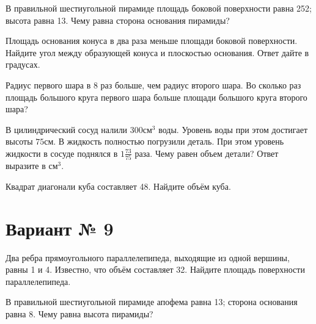 \documentclass[4apaper]{article}
\begin{document}
\begin{taskBN}{2}
В правильной шестиугольной пирамиде площадь боковой поверхности равна 252; высота равна 13. Чему равна сторона основания пирамиды?
\end{taskBN}

\begin{taskBN}{3}
Площадь основания конуса в два раза меньше площади боковой поверхности. Найдите угол между образующей конуса и плоскостью основания. Ответ дайте в градусах.
\end{taskBN}

\begin{taskBN}{4}
Радиус первого шара в 8 раз больше, чем радиус второго шара. Во сколько раз площадь большого круга первого шара больше площади большого круга второго шара?
\end{taskBN}

\begin{taskBN}{5}
В цилиндрический сосуд налили $300\mbox{см}^3$ воды. Уровень воды при этом достигает высоты $75$см. В жидкость полностью погрузили деталь. При этом уровень жидкости в сосуде поднялся в ${1}\frac{73}{75}$ раза. Чему равен объем детали? Ответ выразите в $\mbox{см}^3$.
\end{taskBN}

\begin{taskBN}{6}
Квадрат диагонали куба составляет 48. Найдите объём куба.
\end{taskBN}
\newpage\section*{Вариант № 9}

\begin{taskBN}{1}
Два ребра прямоугольного параллелепипеда, выходящие из одной вершины, равны 1 и 4. Известно, что объём составляет 32. Найдите площадь поверхности параллелепипеда.
\end{taskBN}

\begin{taskBN}{2}
В правильной шестиугольной пирамиде апофема равна 13; сторона основания равна 8. Чему равна высота пирамиды?
\end{taskBN}
\end{document}
